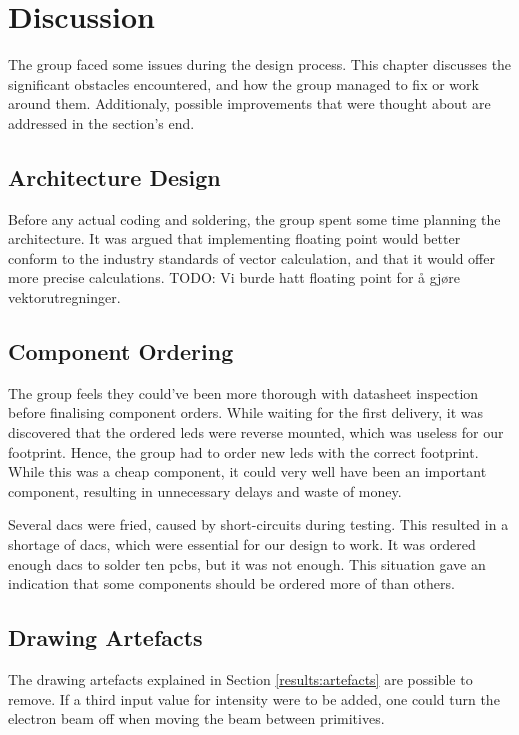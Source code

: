 \chapter{Discussion}

The group faced some issues during the design process. 
This chapter discusses the significant obstacles encountered, and how the group managed to fix or work around them. 
Additionaly, possible improvements that were thought about are addressed in the section's end.


\section{Architecture Design}
Before any actual coding and soldering, the group spent some time planning the architecture.
It was argued that implementing floating point would better conform to the industry standards of vector calculation, and that it would offer more precise calculations.
TODO: Vi burde hatt floating point for å gjøre vektorutregninger.



\section{Component Ordering}
The group feels they could've been more thorough with datasheet inspection before finalising component orders. 
While waiting for the first delivery, it was discovered that the ordered \gls{led}s were reverse mounted, which was useless for our footprint. 
Hence, the group had to order new \gls{led}s with the correct footprint. 
While this was a cheap component, it could very well have been an important component, resulting in unnecessary delays and waste of money.

Several \gls{dac}s were fried, caused by short-circuits during testing. 
This resulted in a shortage of \gls{dac}s, which were essential for our design to work.
It was ordered enough \gls{dac}s to solder ten \gls{pcb}s, but it was not enough. 
This situation gave an indication that some components should be ordered more of than others.



\section{Drawing Artefacts}
\label{discussion:artefacts}
The drawing artefacts explained in Section \ref{results:artefacts} are possible to remove.
If a third input value for intensity were to be added, one could turn the electron beam off when moving the beam between primitives.

